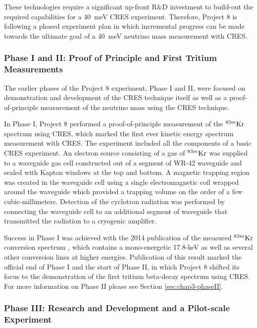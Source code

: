 These technologies require a significant up-front R\&D investment to build-out the required capabilities for a 40~meV CRES experiment. Therefore, Project 8 is following a phased experiment plan in which incremental progress can be made towards the ultimate goal of a 40~meV neutrino mass measurement with CRES.

\subsubsection*{Phase I and II: Proof of Principle and First Tritium Measurements}

The earlier phases of the Project 8 experiment, Phase I and II, were focused on demonstration and development of the CRES technique itself as well as a proof-of-principle measurement of the neutrino mass using the CRES technique.

In Phase I, Project 8 performed a proof-of-principle measurement of the $^{83m}\rm{Kr}$ spectrum using CRES, which marked the first ever kinetic energy spectrum measurement with CRES. The experiment included all the components of a basic CRES experiment. An electron source consisting of a gas of $^{83m}\rm{Kr}$ was supplied to a waveguide gas cell constructed out of a segment of WR-42 waveguide and sealed with Kapton windows at the top and bottom. A magnetic trapping region was created in the waveguide cell using a single electromagnetic coil wrapped around the waveguide which provided a trapping volume on the order of a few cubic-millimeters. Detection of the cyclotron radiation was performed by connecting the waveguide cell to an additional segment of waveguide that transmitted the radiation to a cryogenic amplifier.

Success in Phase I was achieved with the 2014 publication of the measured $^{83m}\rm{Kr}$ conversion spectrum \cite{Project8:2014ivu}, which contains a mono-energetic 17.8-keV as well as several other conversion lines at higher energies. Publication of this result marked the official end of Phase I and the start of Phase II, in which Project 8 shifted its focus to the demonstration of the first tritium beta-decay spectrum using CRES.%
For more information on Phase II please see Section \ref{sec:chap3-phaseII}.

\subsubsection*{Phase III: Research and Development and a Pilot-scale Experiment}

